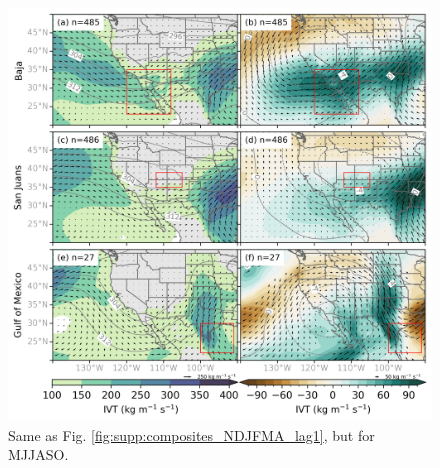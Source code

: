 \documentclass[draft,jgrga]{agutexSI2019}
\begin{document}
\begin{figure}
\noindent\includegraphics[width=\textwidth]{figS4.png}
\caption{Same as Fig. \ref{fig:supp:composites_NDJFMA_lag1}, but for MJJASO.}
\label{fig:supp:composites_MJJASO_lag1}
\end{figure}
\end{document}
